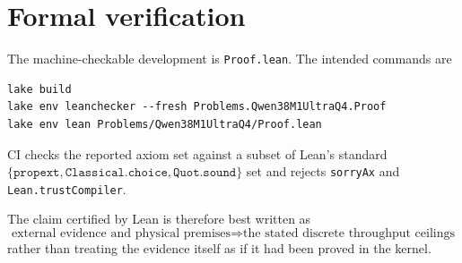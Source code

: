 \documentclass[11pt,a4paper]{article}
\begin{document}
\section{Formal verification}

The machine-checkable development is \texttt{Proof.lean}. The intended commands are
\begin{verbatim}
lake build
lake env leanchecker --fresh Problems.Qwen38M1UltraQ4.Proof
lake env lean Problems/Qwen38M1UltraQ4/Proof.lean
\end{verbatim}
CI checks the reported axiom set against a subset of Lean's standard $\{\texttt{propext},\texttt{Classical.choice},\texttt{Quot.sound}\}$ set and rejects \texttt{sorryAx} and \texttt{Lean.trustCompiler}.

The claim certified by Lean is therefore best written as
\[
\boxed{
\text{external evidence and physical premises}
\Longrightarrow
\text{the stated discrete throughput ceilings}}
\]
rather than treating the evidence itself as if it had been proved in the kernel.
\end{document}
